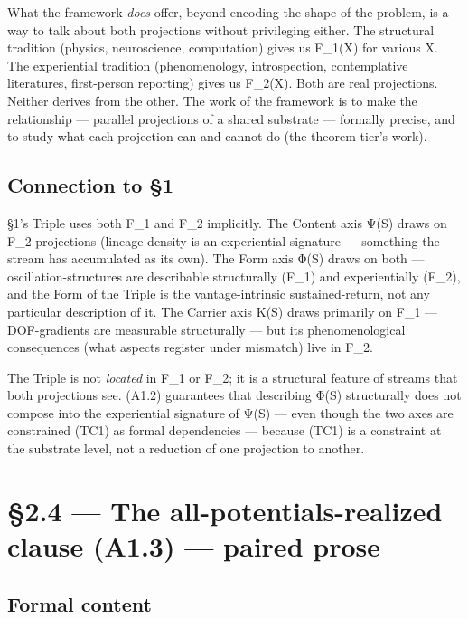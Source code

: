 \documentclass[11pt, openany]{book}
\newcommand{\sectionbreak}{\clearpage}
\begin{document}
What the framework \textit{does} offer, beyond encoding the shape of the problem, is a way to talk about both projections without privileging either. The structural tradition (physics, neuroscience, computation) gives us F\_\allowbreak{}1(X) for various X. The experiential tradition (phenomenology, introspection, contemplative literatures, first-person reporting) gives us F\_\allowbreak{}2(X). Both are real projections. Neither derives from the other. The work of the framework is to make the relationship --- parallel projections of a shared substrate --- formally precise, and to study what each projection can and cannot do (the theorem tier's work).

\subsection{Connection to §1}

§1's Triple uses both F\_\allowbreak{}1 and F\_\allowbreak{}2 implicitly. The Content axis Ψ(S) draws on F\_\allowbreak{}2-projections (lineage-density is an experiential signature --- something the stream has accumulated as its own). The Form axis Φ(S) draws on both --- oscillation-structures are describable structurally (F\_\allowbreak{}1) and experientially (F\_\allowbreak{}2), and the Form of the Triple is the vantage-intrinsic sustained-return, not any particular description of it. The Carrier axis Κ(S) draws primarily on F\_\allowbreak{}1 --- DOF-gradients are measurable structurally --- but its phenomenological consequences (what aspects register under mismatch) live in F\_\allowbreak{}2.

The Triple is not \textit{located} in F\_\allowbreak{}1 or F\_\allowbreak{}2; it is a structural feature of streams that both projections see. (A1.2) guarantees that describing Φ(S) structurally does not compose into the experiential signature of Ψ(S) --- even though the two axes are constrained (TC1) as formal dependencies --- because (TC1) is a constraint at the substrate level, not a reduction of one projection to another.

\sectionbreak

\section{§2.4 --- The all-potentials-realized clause (A1.3) --- paired prose}

\subsection{Formal content}
\end{document}
